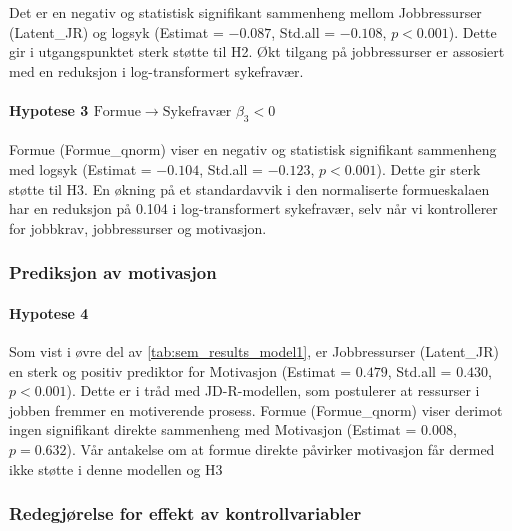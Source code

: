 \documentclass[
  12pt,
  a4paper,
  DIV=11,
  numbers=noendperiod]{scrartcl}
\let\oldparagraph\paragraph
\renewcommand{\paragraph}[1]{\oldparagraph{#1}\mbox{}}
\begin{document}
Det er en negativ og statistisk signifikant sammenheng mellom
Jobbressurser (Latent\_JR) og logsyk (Estimat = \(-0.087\), Std.all =
\(-0.108\), \(p < 0.001\)). Dette gir i utgangspunktet sterk støtte til
H2. Økt tilgang på jobbressurser er assosiert med en reduksjon i
log-transformert sykefravær.

\paragraph{\texorpdfstring{Hypotese 3
\(\text{Formue} \rightarrow \text{Sykefravær } \beta_3 < 0\)}{Hypotese 3 \textbackslash text\{Formue\} \textbackslash rightarrow \textbackslash text\{Sykefravær \} \textbackslash beta\_3 \textless{} 0}}\label{hypotese-3-textformue-rightarrow-textsykefravuxe6r-beta_3-0}

Formue (Formue\_qnorm) viser en negativ og statistisk signifikant
sammenheng med logsyk (Estimat = \(-0.104\), Std.all = \(-0.123\),
\(p < 0.001\)). Dette gir sterk støtte til H3. En økning på et
standardavvik i den normaliserte formueskalaen har en reduksjon på 0.104
i log-transformert sykefravær, selv når vi kontrollerer for jobbkrav,
jobbressurser og motivasjon.

\subsubsection{Prediksjon av motivasjon}\label{prediksjon-av-motivasjon}

\paragraph{Hypotese 4}\label{hypotese-4}

Som vist i øvre del av \autoref{tab:sem_results_model1}, er
Jobbressurser (Latent\_JR) en sterk og positiv prediktor for Motivasjon
(Estimat = \(0.479\), Std.all = \(0.430\), \(p < 0.001\)). Dette er i
tråd med JD-R-modellen, som postulerer at ressurser i jobben fremmer en
motiverende prosess. Formue (Formue\_qnorm) viser derimot ingen
signifikant direkte sammenheng med Motivasjon (Estimat = \(0.008\),
\(p = 0.632\)). Vår antakelse om at formue direkte påvirker motivasjon
får dermed ikke støtte i denne modellen og H3

\subsubsection{Redegjørelse for effekt av
kontrollvariabler}\label{redegjuxf8relse-for-effekt-av-kontrollvariabler}
\end{document}
